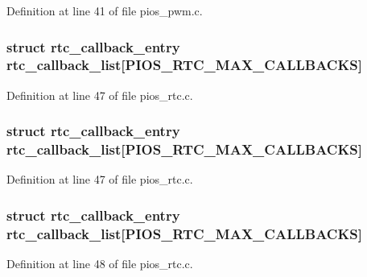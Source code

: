 \-Definition at line 41 of file pios\-\_\-pwm.\-c.

\hypertarget{group___p_i_o_s___p_w_m_ga4cb0707cdd245f2578d3f444bd852fd7}{
\subsubsection[{rtc\-\_\-callback\-\_\-list}]{\setlength{\rightskip}{0pt plus 5cm}struct {\bf rtc\-\_\-callback\-\_\-entry} {\bf rtc\-\_\-callback\-\_\-list}\mbox{[}\-P\-I\-O\-S\-\_\-\-R\-T\-C\-\_\-\-M\-A\-X\-\_\-\-C\-A\-L\-L\-B\-A\-C\-K\-S\mbox{]}}}\label{group___p_i_o_s___p_w_m_ga4cb0707cdd245f2578d3f444bd852fd7}


\-Definition at line 47 of file pios\-\_\-rtc.\-c.

\hypertarget{group___p_i_o_s___p_w_m_ga4cb0707cdd245f2578d3f444bd852fd7}{
\subsubsection[{rtc\-\_\-callback\-\_\-list}]{\setlength{\rightskip}{0pt plus 5cm}struct {\bf rtc\-\_\-callback\-\_\-entry} {\bf rtc\-\_\-callback\-\_\-list}\mbox{[}\-P\-I\-O\-S\-\_\-\-R\-T\-C\-\_\-\-M\-A\-X\-\_\-\-C\-A\-L\-L\-B\-A\-C\-K\-S\mbox{]}}}\label{group___p_i_o_s___p_w_m_ga4cb0707cdd245f2578d3f444bd852fd7}


\-Definition at line 47 of file pios\-\_\-rtc.\-c.

\hypertarget{group___p_i_o_s___p_w_m_ga4cb0707cdd245f2578d3f444bd852fd7}{
\subsubsection[{rtc\-\_\-callback\-\_\-list}]{\setlength{\rightskip}{0pt plus 5cm}struct {\bf rtc\-\_\-callback\-\_\-entry} {\bf rtc\-\_\-callback\-\_\-list}\mbox{[}\-P\-I\-O\-S\-\_\-\-R\-T\-C\-\_\-\-M\-A\-X\-\_\-\-C\-A\-L\-L\-B\-A\-C\-K\-S\mbox{]}}}\label{group___p_i_o_s___p_w_m_ga4cb0707cdd245f2578d3f444bd852fd7}


\-Definition at line 48 of file pios\-\_\-rtc.\-c.


